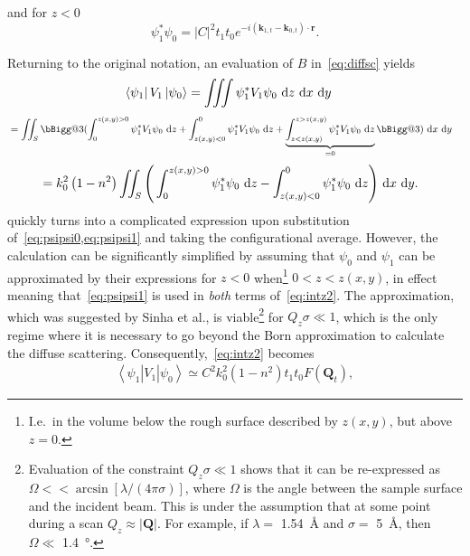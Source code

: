 \documentclass[10pt,twoside, b5paper,pdftex]{report}
\makeatletter
\newcommand{\bra}[1]{\ensuremath{\left\langle#1\right|}}
\newcommand{\ket}[1]{\ensuremath{\left|#1\right\rangle}}
\newcommand{\lik}[0]{\ensuremath{&=}}
\newcommand{\vast}{\bBigg@{3}}
\makeatother
\begin{document}
%
and for $z < 0$
%
\begin{equation} \label{eq:psipsi1}
\psi_{1}^{*}\psi_{0} =  |C|^{2}t_{1}t_{0}e^{-i\left(\mathbf{k}_{1,t}-\mathbf{k}_{0,t}\right)\cdot\mathbf{r}} .
\end{equation}

Returning to the original notation, an evaluation of $B$ in~\cref{eq:diffsc} yields
\begin{align}
\bra{\psi_{1}}V_{1}\ket{\psi_{0}} \lik \iiint{\psi_{1}^{*}V_{1}\psi_{0}} \mbox{~d}z \mbox{~d}x \mbox{~d}y\notag
\end{align}
\begin{align}
\lik \iint_S \vast( \int_{0}^{z\left(x,y\right)>0}{\psi_{1}^{*}V_{1}\psi_{0}} \mbox{~d}z +\int_{z\left(x,y\right)<0}^{0}{\psi_{1}^{*}V_{1}\psi_{0}} \mbox{~d}z+\underbrace{\int_{z<z\left(x,y\right)}^{z>z\left(x,y\right)}{\psi_{1}^{*}V_{1}\psi_{0}} \mbox{~d}z}_{=0} \vast) \mbox{~d}x \mbox{~d}y \notag%
\end{align}
\begin{align}
\lik k_{0}^{2}\left(1-n^{2}\right)\iint_S\Bigg(\int_{0}^{z\left(x,y\right)>0}{\psi_{1}^{*}\psi_{0}} \mbox{~d}z - \int_{z\left(x,y\right)<0}^{0}{\psi_{1}^{*}\psi_{0}} \mbox{~d}z\Bigg) \mbox{~d}x \mbox{~d}y .\label{eq:intz2}
\end{align}
 quickly turns into a complicated expression upon substitution of~\cref{eq:psipsi0,eq:psipsi1} and taking the configurational average. However, the calculation can be significantly simplified by assuming that $\psi_0$ and $\psi_1$ can be approximated by their expressions for $z < 0$ when\footnote{I.e.~in the volume below the rough surface described by $z(x,y)$, but above $z = 0$.} $0 < z < z(x,y)$, in effect meaning that~\cref{eq:psipsi1} is used in {\it both} terms of~\cref{eq:intz2}. The approximation, which was suggested by Sinha et al., is viable\footnote{Evaluation of the constraint $Q_z\sigma \ll 1$ shows that it can be re-expressed as $\Omega << \arcsin{[\lambda/(4\pi\sigma)]}$, where $\Omega$ is the angle between the sample surface and the incident beam. This is under the assumption that at some point during a scan $Q_z \approx |\mathbf{Q}|$. For example, if $\lambda =$ \SI{1.54}{\angstrom} and $\sigma =$ \SI{5}{\angstrom}, then $\Omega \ll$ \SI{1.4}{\degree}.} for $Q_z\sigma \ll 1$, which is the only regime where it is necessary to go beyond the Born approximation to calculate the diffuse scattering. Consequently,~\cref{eq:intz2} becomes
\begin{align}
    \bra{\psi_{1}}V_{1}\ket{\psi_{0}} \simeq C^{2}k_{0}^{2}\left(1-n^{2}\right)t_{1}t_{0}F\left(\mathbf{Q}_{t}\right), \label{eq:psi1rel}
\end{align} 
\end{document}
